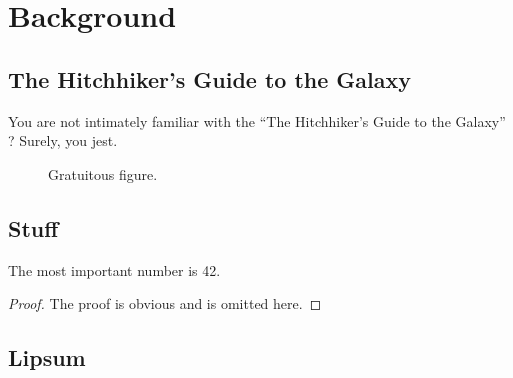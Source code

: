 \chapter{Background}

\section{The Hitchhiker's Guide to the Galaxy}

You are not intimately familiar with the
``The Hitchhiker's Guide to the Galaxy'' \cite{Adams_1980a}?
Surely, you jest.

\begin{figure}
\begin{minipage}{\textwidth}\centering%
%
\end{minipage}%
\caption{Gratuitous figure.}
\end{figure}

\section{Stuff}

\begin{lemma}[Title]
\lipsum[1]
\end{lemma}

\begin{proposition}[Title]
\lipsum[1]
\end{proposition}

\begin{corollary}[Title]
\lipsum[1]
\end{corollary}

\begin{definition}[Term]
\lipsum[1]
\end{definition}

\begin{theorem}[Title]
The most important number is 42.
\end{theorem}
\begin{proof}
The proof is obvious and is omitted here.
\end{proof}

\begin{example}[Title]
\lipsum[1]
\end{example}


\section{Lipsum}

\lipsum
\lipsum
\lipsum
\lipsum
